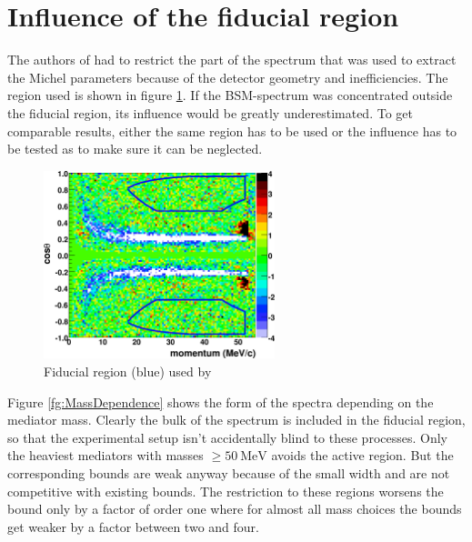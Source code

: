 \section{Influence of the fiducial region}
The authors of \cite{TWIST:2011aa} had to restrict the part of the spectrum that was used to extract the Michel parameters because of the detector geometry and inefficiencies. The region used is shown in figure \ref{fg:FiducialRegion}. If the BSM-spectrum was concentrated outside the fiducial region, its influence would be greatly underestimated. To get comparable results, either the same region has to be used or the influence has to be tested as to make sure it can be neglected. 
\begin{figure}[ht]
  \centering
    \includegraphics[width=0.6\textwidth]{imgs/fiducial}
    \caption{Fiducial region (blue) used by \cite{TWIST:2011aa}}
    \label{fg:FiducialRegion}
\end{figure}
Figure \ref{fg:MassDependence} shows the form of the spectra depending on the mediator mass. Clearly the bulk of the spectrum is included in the fiducial region, so that the experimental setup isn't accidentally blind to these processes. Only the heaviest mediators with masses $\geq \SI{50}{\mega \eV}$ avoids the active region. But the corresponding bounds are weak anyway because of the small width and are not competitive with existing bounds. 
The restriction to these regions worsens the bound only by a factor of order one where for almost all mass choices the bounds get weaker by a factor between two and four.
